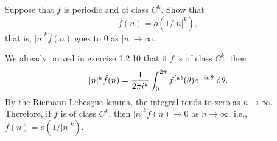 \begin{exrc}[13]
    Suppose that \(f\) is periodic and of class \(C^k\).
    Show that
    \begin{equation*}
        \hat{f}(n) = o(1 / |n|^k),
    \end{equation*}
    that is, \(|n|^k \hat{f}(n)\) goes to 0 as \(|n| \to \infty\).

\begin{soln}
    We already proved in exercise 1.2.10 that if \(f\) is of class \(C^k\), then
    \begin{equation*}
        |n|^k \hat{f}(n) = \frac{1}{2\pi i^k} \int_{0}^{2\pi} f^{(k)}(\theta) e^{-in\theta} \;\mathrm d \theta.
    \end{equation*}
    By the Riemann-Lebesgue lemma, the integral tends to zero as \(n \to \infty\).
    Therefore, if \(f\) is of class \(C^k\), then \(|n|^k \hat{f}(n) \to 0\) as \(n \to \infty\),
    i.e., \(\hat{f}(n) = o(1 / |n|^k)\).

\end{soln}
\end{exrc}
